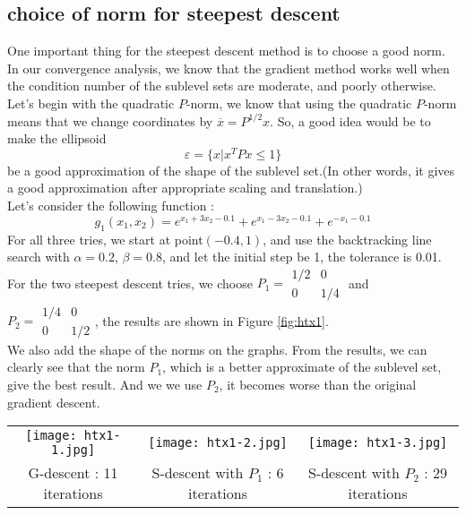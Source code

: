 \documentclass{acm_proc_article-sp}
\begin{document}
\subsection{choice of norm for steepest descent}
One important thing for the steepest descent method is to choose a good norm. In our convergence analysis, we know that the gradient method works well when the condition number of the sublevel sets are moderate, and poorly otherwise. Let's begin with the quadratic $P$-norm, we know that using the quadratic $P$-norm means that we change coordinates by $\overline{x} = P^{1/2}x$. So, a good idea would be to make the ellipsoid
\begin{displaymath}
\varepsilon = \{ x | x^TPx \leq 1\}
\end{displaymath}
be a good approximation of the shape of the sublevel set.(In other words, it gives a good approximation after appropriate scaling and translation.) \\
Let's consider the following function :
\begin{displaymath}
g_1(x_1, x_2) = e ^ {x_1 + 3x_2 -0.1} + e ^ {x_1-3x_2-0.1} + e^{-x_1-0.1}
\end{displaymath}
For all three tries, we start at point$(-0.4,1)$, and use the backtracking line search with $\alpha=0.2$, $\beta=0.8$, and let the initial step be 1, the tolerance is 0.01. For the two steepest descent tries, we choose $P_1 = \begin{array}{cc} 1/2 & 0 \\ 0 & 1/4\end{array}$ and
$P_2 = \begin{array}{cc} 1/4 & 0 \\ 0 & 1/2\end{array}$, the results are shown in Figure \ref{fig:htx1}.\\
We also add the shape of the norms on the graphs. From the results, we can clearly see that the norm $P_1$, which is a better
approximate of the sublevel set, give the best result. And we we use $P_2$, it becomes worse than the original gradient descent. \\
\begin{figure*}[hp]
        \begin{tabular}{ccc}
            \texttt{[image: htx1-1.jpg]} &
            \texttt{[image: htx1-2.jpg]} &
            \texttt{[image: htx1-3.jpg]} \\
            G-descent : 11 iterations &
            S-descent with $P_1$ : 6 iterations &
            S-descent with $P_2$ : 29 iterations
        \end{tabular}
    \caption{\label{fig:htx1}Three methods for $g_1$.}
\end{figure*}
\end{document}
